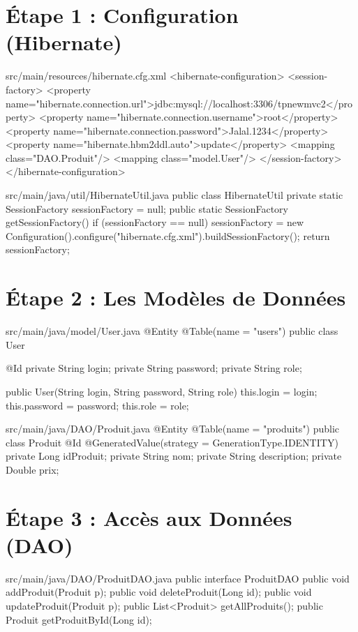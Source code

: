 \documentclass[12pt,a4paper]{article}
\begin{document}
\section{Étape 1 : Configuration (Hibernate)}
\begin{codeholder}{src/main/resources/hibernate.cfg.xml}
<hibernate-configuration>
    <session-factory>
        <property name="hibernate.connection.url">jdbc:mysql://localhost:3306/tpnewmvc2</property>
        <property name="hibernate.connection.username">root</property>
        <property name="hibernate.connection.password">Jalal.1234</property>
        <property name="hibernate.hbm2ddl.auto">update</property>
        <mapping class="DAO.Produit"/>
        <mapping class="model.User"/>
    </session-factory>
</hibernate-configuration>
\end{codeholder}

\begin{codeholder}{src/main/java/util/HibernateUtil.java}
public class HibernateUtil {
    private static SessionFactory sessionFactory = null;
    public static SessionFactory getSessionFactory() {
        if (sessionFactory == null) {
            sessionFactory = new Configuration().configure("hibernate.cfg.xml").buildSessionFactory();
        }
        return sessionFactory;
    }
}
\end{codeholder}

\section{Étape 2 : Les Modèles de Données}
\begin{codeholder}{src/main/java/model/User.java}
@Entity @Table(name = "users")
public class User {
    @Id private String login;
    private String password;
    private String role;
    
    public User(String login, String password, String role) {
        this.login = login; this.password = password; this.role = role;
    }
}
\end{codeholder}

\begin{codeholder}{src/main/java/DAO/Produit.java}
@Entity @Table(name = "produits")
public class Produit {
    @Id @GeneratedValue(strategy = GenerationType.IDENTITY)
    private Long idProduit;
    private String nom;
    private String description;
    private Double prix;
}
\end{codeholder}

\section{Étape 3 : Accès aux Données (DAO)}
\begin{codeholder}{src/main/java/DAO/ProduitDAO.java}
public interface ProduitDAO {
    public void addProduit(Produit p);
    public void deleteProduit(Long id);
    public void updateProduit(Produit p);
    public List<Produit> getAllProduits();
    public Produit getProduitById(Long id);
}
\end{codeholder}
\end{document}
